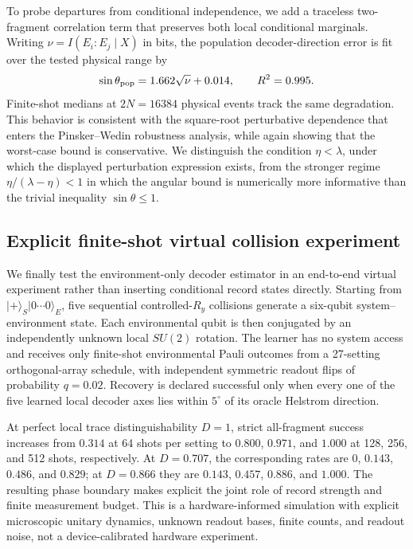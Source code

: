 To probe departures from conditional independence, we add a traceless
two-fragment correlation term that preserves both local conditional marginals.
Writing $\nu=I(E_i:E_j\mid X)$ in bits, the population decoder-direction error
is fit over the tested physical range by
\begin{equation}
\sin\theta_{\rm pop}=1.662\sqrt{\nu}+0.014,
\qquad R^2=0.995.
\end{equation}
Finite-shot medians at $2N=16384$ physical events track the same degradation.
This behavior is consistent with the square-root perturbative dependence that
enters the Pinsker--Wedin robustness analysis, while again showing that the
worst-case bound is conservative.  We distinguish the condition
$\eta<\lambda$, under which the displayed perturbation expression exists, from
the stronger regime $\eta/(\lambda-\eta)<1$ in which the angular bound is
numerically more informative than the trivial inequality $\sin\theta\le1$.

\subsection{Explicit finite-shot virtual collision experiment}

We finally test the environment-only decoder estimator in an end-to-end virtual
experiment rather than inserting conditional record states directly.  Starting
from $\lvert+\rangle_S\lvert0\cdots0\rangle_E$, five sequential controlled-$R_y$
collisions generate a six-qubit system--environment state.  Each environmental
qubit is then conjugated by an independently unknown local $SU(2)$ rotation.
The learner has no system access and receives only finite-shot environmental
Pauli outcomes from a 27-setting orthogonal-array schedule, with independent
symmetric readout flips of probability $q=0.02$.  Recovery is declared
successful only when every one of the five learned local decoder axes lies
within $5^\circ$ of its oracle Helstrom direction.

At perfect local trace distinguishability $D=1$, strict all-fragment success
increases from $0.314$ at 64 shots per setting to $0.800$, $0.971$, and $1.000$
at 128, 256, and 512 shots, respectively.  At $D=0.707$, the corresponding
rates are $0$, $0.143$, $0.486$, and $0.829$; at $D=0.866$ they are $0.143$,
$0.457$, $0.886$, and $1.000$.  The resulting phase boundary makes explicit
the joint role of record strength and finite measurement budget.  This is a
hardware-informed simulation with explicit microscopic unitary dynamics,
unknown readout bases, finite counts, and readout noise, not a device-calibrated
hardware experiment.


